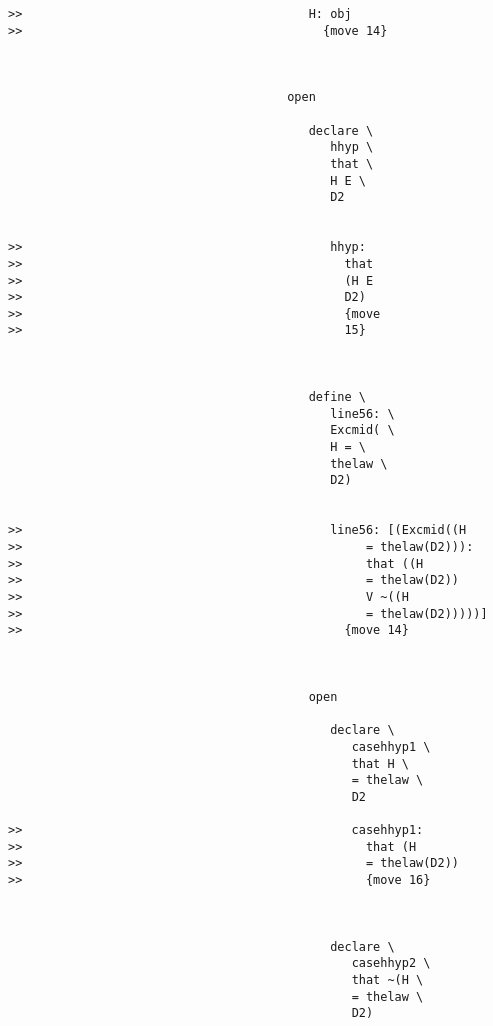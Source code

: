 \documentclass[12pt]{article}
\begin{document}
\begin{verbatim}
>>                                        H: obj
>>                                          {move 14}



                                       open

                                          declare \
                                             hhyp \
                                             that \
                                             H E \
                                             D2


>>                                           hhyp:
>>                                             that
>>                                             (H E
>>                                             D2)
>>                                             {move
>>                                             15}



                                          define \
                                             line56: \
                                             Excmid( \
                                             H = \
                                             thelaw \
                                             D2)


>>                                           line56: [(Excmid((H
>>                                                = thelaw(D2))):
>>                                                that ((H
>>                                                = thelaw(D2))
>>                                                V ~((H
>>                                                = thelaw(D2)))))]
>>                                             {move 14}



                                          open

                                             declare \
                                                casehhyp1 \
                                                that H \
                                                = thelaw \
                                                D2

>>                                              casehhyp1:
>>                                                that (H
>>                                                = thelaw(D2))
>>                                                {move 16}



                                             declare \
                                                casehhyp2 \
                                                that ~(H \
                                                = thelaw \
                                                D2)


\end{verbatim}
\end{document}
